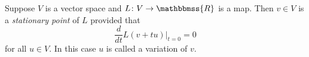 \documentclass[12pt]{article}
\newcommand{\R}{\mathbbmss{R}}
\begin{document}
Suppose $V$ is a vector space and $L\colon V\to \R$ is a map. 
Then $v\in V$ is a \emph{stationar{y} point} of $L$
provided that 
$$
  \frac{d}{dt}L(v+t u)\Big|_{t=0} =0
$$
for all $u\in V$. In this case $u$ is called a variation of $v$.

%
%
\end{document}
